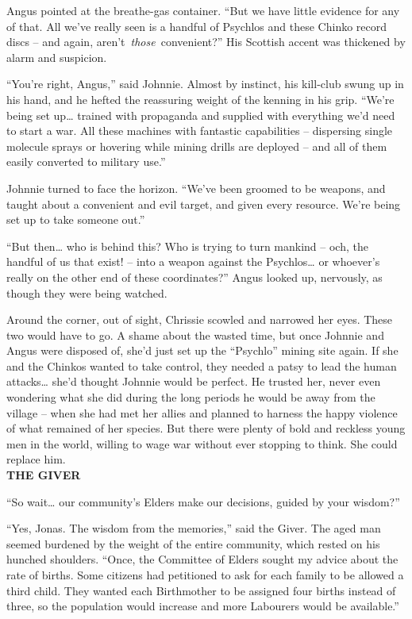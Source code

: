 Angus pointed at the breathe-gas container. ``But we have little
evidence for any of that. All we've really seen is a handful of Psychlos
and these Chinko record discs -- and again,
aren't~\emph{those}~convenient?'' His Scottish accent was thickened by
alarm and suspicion.

``You're right, Angus,'' said Johnnie. Almost by instinct, his kill-club
swung up in his hand, and he hefted the reassuring weight of the kenning
in his grip. ``We're being set up\ldots{} trained with propaganda and
supplied with everything we'd need to start a war. All these machines
with fantastic capabilities -- dispersing single molecule sprays or
hovering while mining drills are deployed -- and all of them easily
converted to military use.''

Johnnie turned to face the horizon. ``We've been groomed to be weapons,
and taught about a convenient and evil target, and given every resource.
We're being set up to take someone out.''

``But then\ldots{} who is behind this? Who is trying to turn mankind --
och, the handful of us that exist! -- into a weapon against the
Psychlos\ldots{} or whoever's really on the other end of these
coordinates?'' Angus looked up, nervously, as though they were being
watched.

Around the corner, out of sight, Chrissie scowled and narrowed her eyes.
These two would have to go. A shame about the wasted time, but once
Johnnie and Angus were disposed of, she'd just set up the ``Psychlo''
mining site again. If she and the Chinkos wanted to take control, they
needed a patsy to lead the human attacks\ldots{} she'd thought Johnnie
would be perfect. He trusted her, never even wondering what she did
during the long periods he would be away from the village -- when she
had met her allies and planned to harness the happy violence of what
remained of her species. But there were plenty of bold and reckless
young men in the world, willing to wage war without ever stopping to
think. She could replace him.\\

\textbf{THE GIVER}

``So wait\ldots{} our community's Elders make our decisions, guided by
your wisdom?''

``Yes, Jonas. The wisdom from the memories,'' said the Giver. The aged
man seemed burdened by the weight of the entire community, which rested
on his hunched shoulders. ``Once, the Committee of Elders sought my
advice about the rate of births. Some citizens had petitioned to ask for
each family to be allowed a third child. They wanted each Birthmother to
be assigned four births instead of three, so the population would
increase and more Labourers would be available.''

